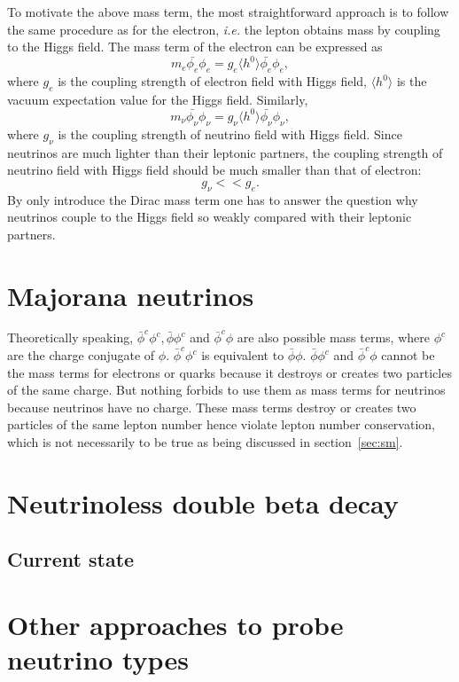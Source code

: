 To motivate the above mass term, the most straightforward approach is to follow the same procedure as for the electron, \textit{i.e.} the lepton obtains mass by coupling to the Higgs field. The mass term of the electron can be expressed as
\begin{equation}
  \label{eq:dm}
  m_{e}\bar{\phi_e}\phi_{e} = g_{e}\langle h^{0}\rangle\bar{\phi_e}\phi_{e},
\end{equation}
where $g_e$ is the coupling strength of electron field with Higgs field, $\langle h^{0}\rangle$ is the vacuum expectation value for the Higgs field. Similarly,
\begin{equation}
  \label{eq:dm}
  m_{\nu}\bar{\phi_\nu}\phi_{\nu} = g_{\nu}\langle h^{0}\rangle\bar{\phi_\nu}\phi_{\nu},
\end{equation}
where $g_\nu$ is the coupling strength of neutrino field with Higgs field. Since neutrinos are much lighter than their leptonic partners, the coupling strength of neutrino field with Higgs field should be much smaller than that of electron:
\begin{equation}
  \label{eq:dm}
  g_{\nu}<<g_{e}.
\end{equation}
By only introduce the Dirac mass term one has to answer the question why neutrinos couple to the Higgs field so weakly compared with their leptonic partners.

\section{Majorana neutrinos}
\label{sec:major}
Theoretically speaking, $\bar{\phi}^{c}\phi^{c}, \bar{\phi}\phi^{c}$ and $\bar{\phi}^{c}\phi$ are also possible mass terms, where $\phi^{c}$ are the charge conjugate of $\phi$. $\bar{\phi}^{c}\phi^{c}$ is equivalent to $\bar{\phi}\phi$. $\bar{\phi}\phi^{c}$ and $\bar{\phi}^{c}\phi$ cannot be the mass terms for electrons or quarks because it destroys or creates two particles of the same charge. But nothing forbids to use them as mass terms for neutrinos because neutrinos have no charge. These mass terms destroy or creates two particles of the same lepton number hence violate lepton number conservation, which is not necessarily to be true as being discussed in section~\ref{sec:sm}.

\section{Neutrinoless double beta decay}
\label{sec:0n2b}

\subsection{Current state}
\label{sec:state}

\section{Other approaches to probe neutrino types}
\label{sec:others}



